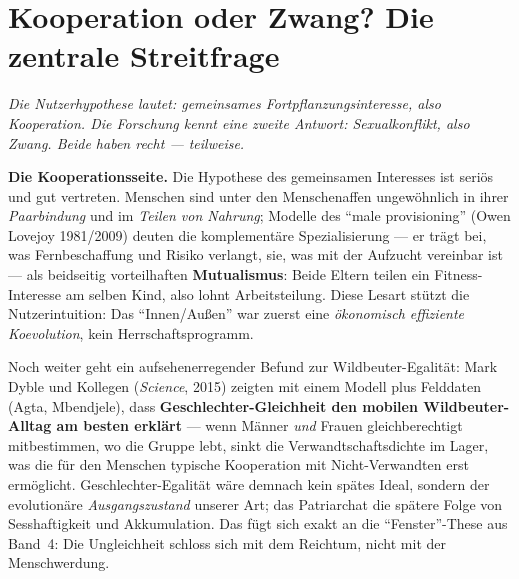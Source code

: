 \documentclass[11pt,a4paper,ngerman]{scrartcl}
\newcommand{\chipbase}[2]{\hspace{0pt}{\footnotesize\textcolor{#1}{[\textsc{#2}]}}}
\newcommand{\chipplausibel}[1]{\chipbase{chipamber}{#1}}
\begin{document}
\section{Kooperation oder Zwang? Die zentrale Streitfrage}
\noindent\textit{Die Nutzerhypothese lautet: gemeinsames Fortpflanzungsinteresse, also Kooperation. Die Forschung kennt eine zweite Antwort: Sexualkonflikt, also Zwang. Beide haben recht --- teilweise.}
\medskip

\textbf{Die Kooperationsseite.} Die Hypothese des gemeinsamen Interesses ist seriös und gut vertreten. Menschen sind unter den Menschenaffen ungewöhnlich in ihrer \emph{Paarbindung} und im \emph{Teilen von Nahrung}; Modelle des \enquote{male provisioning} (Owen Lovejoy 1981/2009) deuten die komplementäre Spezialisierung --- er trägt bei, was Fernbeschaffung und Risiko verlangt, sie, was mit der Aufzucht vereinbar ist --- als beidseitig vorteilhaften \textbf{Mutualismus}: Beide Eltern teilen ein Fitness-Interesse am selben Kind, also lohnt Arbeitsteilung. \chipplausibel{plausibel} Diese Lesart stützt die Nutzerintuition: Das \enquote{Innen/Außen} war zuerst eine \emph{ökonomisch effiziente Koevolution}, kein Herrschaftsprogramm.

Noch weiter geht ein aufsehenerregender Befund zur Wildbeuter-Egalität: Mark Dyble und Kollegen (\emph{Science}, 2015) zeigten mit einem Modell plus Felddaten (Agta, Mbendjele), dass \textbf{Geschlechter-Gleichheit den mobilen Wildbeuter-Alltag am besten erklärt} --- wenn Männer \emph{und} Frauen gleichberechtigt mitbestimmen, wo die Gruppe lebt, sinkt die Verwandtschaftsdichte im Lager, was die für den Menschen typische Kooperation mit Nicht-Verwandten erst ermöglicht. Geschlechter-Egalität wäre demnach kein spätes Ideal, sondern der evolutionäre \emph{Ausgangszustand} unserer Art; das Patriarchat die spätere Folge von Sesshaftigkeit und Akkumulation. \chipplausibel{plausibel} Das fügt sich exakt an die \enquote{Fenster}-These aus Band~4: Die Ungleichheit schloss sich mit dem Reichtum, nicht mit der Menschwerdung.
\end{document}
